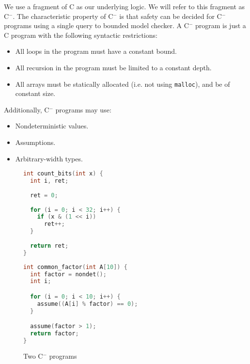 \documentclass[a4paper]{llncs}
\newcommand{\newC}{C$^-$\xspace}
\begin{document}
We use a fragment of C as our underlying logic.  We will refer to this fragment
as \newC.  The characteristic property of \newC is that safety can be decided for
\newC programs using a single query to bounded model checker.  A \newC program is
just a C program with the following syntactic restrictions:

\begin{itemize}
 \item All loops in the program must have a constant bound.
 \item All recursion in the program must be limited to a constant depth.
 \item All arrays must be statically allocated (i.e. not using \texttt{malloc}),
 and be of constant size.
\end{itemize}

Additionally, \newC programs may use:

\begin{itemize}
 \item Nondeterministic values.
 \item Assumptions.
 \item Arbitrary-width types.
\end{itemize}

\begin{figure}
\begin{minipage}[scale=0.8]{0.45\linewidth}
 \begin{lstlisting}[language=c]
int count_bits(int x) {
  int i, ret;
  
  ret = 0;
  
  for (i = 0; i < 32; i++) {
    if (x & (1 << i))
      ret++;
  }
  
  return ret;
}
 \end{lstlisting}
\end{minipage}
\begin{minipage}{0.54\linewidth}
 \begin{lstlisting}[language=C]
int common_factor(int A[10]) {
  int factor = nondet();
  int i;

  for (i = 0; i < 10; i++) {
    assume((A[i] % factor) == 0);
  }

  assume(factor > 1);
  return factor;
}

 \end{lstlisting}
\end{minipage}

 \caption{Two \newC programs}
 \label{fig:c-}

\end{figure}
\end{document}
